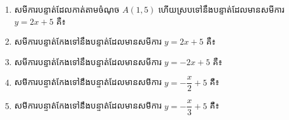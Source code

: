 \begin{enumerate}
\item សមីការបន្ទាត់ដែលកាត់តាមចំណុច $A(1,5)$ ហើយស្របទៅនឹងបន្ទាត់ដែលមានសមីការ $y=2x+5$ គឺ៖
\begin{enumerate}[label=\alph*.]
\end{enumerate}

\item សមីការបន្ទាត់កែងទៅនឹងបន្ទាត់ដែលមានសមីការ $y=2x+5$ គឺ៖
\begin{enumerate}[label=\alph*.]
\end{enumerate}

\item សមីការបន្ទាត់កែងទៅនឹងបន្ទាត់ដែលមានសមីការ $y=-2x+5$ គឺ៖
\begin{enumerate}[label=\alph*.]
\end{enumerate}

\item សមីការបន្ទាត់កែងទៅនឹងបន្ទាត់ដែលមានសមីការ $y=-\dfrac{x}{2}+5$ គឺ៖
\begin{enumerate}[label=\alph*.]
\end{enumerate}

\item សមីការបន្ទាត់កែងទៅនឹងបន្ទាត់ដែលមានសមីការ $y=-\dfrac{x}{3}+5$ គឺ៖
\begin{enumerate}[label=\alph*.]
\end{enumerate}


\end{enumerate}
